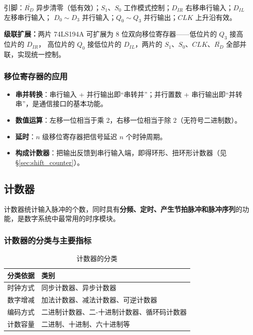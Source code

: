 \noindent 引脚：$\overline{R_D}$ 异步清零（低有效）；$S_1$、$S_0$ 工作模式控制；$D_{IR}$ 右移串行输入；$D_{IL}$ 左移串行输入；
$D_0\sim D_3$ 并行输入；$Q_0\sim Q_3$ 并行输出；$CLK$ 上升沿有效。

\noindent \textbf{级联扩展：}两片 74LS194A 可扩展为 8 位双向移位寄存器——低位片的 $Q_3$ 接高位片的 $D_{IR}$，
高位片的 $Q_0$ 接低位片的 $D_{IL}$，两片的 $S_1$、$S_0$、$CLK$、$\overline{R_D}$ 全部并联，实现统一控制。

\subsubsection{移位寄存器的应用}
\begin{itemize}
    \item \textbf{串并转换}：串行输入 + 并行输出即“串转并”；并行置数 + 串行输出即“并转串”，是通信接口的基本功能。
    \item \textbf{数值运算}：左移一位相当于乘 2，右移一位相当于除 2（无符号二进制数）。
    \item \textbf{延时}：$n$ 级移位寄存器把信号延迟 $n$ 个时钟周期。
    \item \textbf{构成计数器}：把输出反馈到串行输入端，即得环形、扭环形计数器（见 \S\ref{sec:shift_counter}）。
\end{itemize}

\subsection{计数器}
计数器统计输入脉冲的个数，同时具有\textbf{分频、定时、产生节拍脉冲和脉冲序列}的功能，是数字系统中最常用的时序模块。

\subsubsection{计数器的分类与主要指标}
\begin{table}[!htbp]
\centering
\caption{计数器的分类}
\begin{tabular}{ll}
\toprule
分类依据 & 类别 \\
\midrule
时钟方式 & 同步计数器、异步计数器 \\
数字增减 & 加法计数器、减法计数器、可逆计数器 \\
编码方式 & 二进制计数器、二-十进制计数器、循环码计数器 \\
计数容量 & 二进制、十进制、六十进制等 \\
\bottomrule
\end{tabular}
\end{table}

